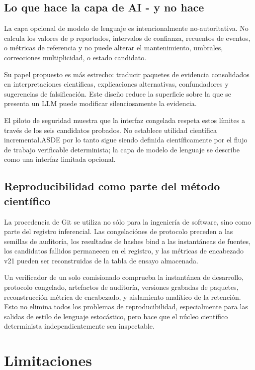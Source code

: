 \documentclass{ieeeaccess}
\begin{document}
\subsection{Lo que hace la capa de AI - y no hace}\label{lo-que-hace-la-capa-de-ai---y-no-hace}

La capa opcional de modelo de lenguaje es intencionalmente no-autoritativa. No calcula los valores de p reportados, intervalos de confianza, recuentos de eventos, o métricas de referencia y no puede alterar el mantenimiento, umbrales, correcciones multiplicidad, o estado candidato.

Su papel propuesto es más estrecho: traducir paquetes de evidencia consolidados en interpretaciones científicas, explicaciones alternativas, confundadores y sugerencias de falsificación. Este diseño reduce la superficie sobre la que se presenta un LLM puede modificar silenciosamente la evidencia.

El piloto de seguridad muestra que la interfaz congelada respeta estos límites a través de los seis candidatos probados. No establece utilidad científica incremental.ASDE por lo tanto sigue siendo definida científicamente por el flujo de trabajo verificable determinista; la capa de modelo de lenguaje se describe como una interfaz limitada opcional.

\subsection{Reproducibilidad como parte del método científico}\label{reproducibilidad-como-parte-del-muxe9todo-cientuxedfico}

La procedencia de Git se utiliza no sólo para la ingeniería de software, sino como parte del registro inferencial. Las congelaciónes de protocolo preceden a las semillas de auditoría, los resultados de hashes bind a las instantáneas de fuentes, los candidatos fallidos permanecen en el registro, y las métricas de encabezado v21 pueden ser reconstruidas de la tabla de ensayo almacenada.

Un verificador de un solo comisionado comprueba la instantánea de desarrollo, protocolo congelado, artefactos de auditoría, versiones grabadas de paquetes, reconstrucción métrica de encabezado, y aislamiento analítico de la retención. Esto no elimina todos los problemas de reproducibilidad, especialmente para las salidas de estilo de lenguaje estocástico, pero hace que el núcleo científico determinista independientemente sea inspectable.

\section{Limitaciones}\label{limitaciones}
\end{document}
